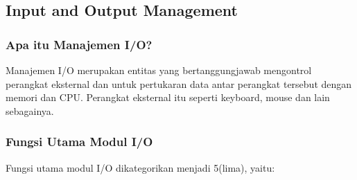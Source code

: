 \documentclass[12pt]{article}
\begin{document}
\subsection{Input and Output Management}
\subsubsection{Apa itu Manajemen I/O?}
Manajemen I/O merupakan entitas yang bertanggungjawab mengontrol perangkat eksternal dan untuk pertukaran data antar perangkat tersebut dengan memori dan CPU. Perangkat eksternal itu seperti keyboard, mouse dan lain sebagainya.
\subsubsection{Fungsi Utama Modul I/O}
Fungsi utama modul I/O dikategorikan menjadi 5(lima), yaitu:
\end{document}
